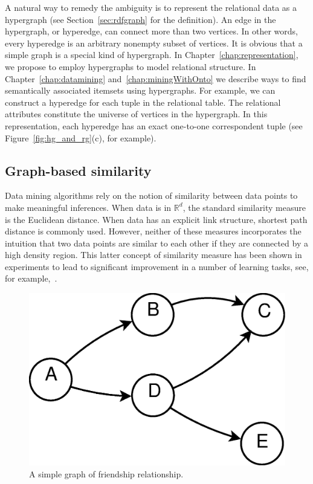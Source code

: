 A natural way to remedy the ambiguity is to represent the relational data as a hypergraph (see Section~\ref{sec:rdfgraph} for the definition). An edge in the hypergraph, or hyperedge, can connect more than two vertices. In other words, every hyperedge is an arbitrary nonempty subset of vertices. It is obvious that a simple graph is a special kind of hypergraph. In Chapter~\ref{chap:representation}, we propose to employ hypergraphs to model relational structure. In Chapter~\ref{chap:datamining} and~\ref{chap:miningWithOnto} we describe ways to find semantically associated itemsets using hypergraphs. For example, we can construct a hyperedge for each tuple in the relational table. The relational attributes constitute the universe of vertices in the hypergraph. In this representation, each hyperedge has an exact one-to-one correspondent tuple (see Figure~\ref{fig:hg_and_rg}(c), for example).

\subsection{Graph-based similarity}
Data mining algorithms rely on the notion of similarity between data points to make meaningful inferences. When data is in $\mathbb{R}^d$, the standard similarity measure is the Euclidean distance. When data has an explicit link structure, shortest path distance is commonly used. However, neither of these measures incorporates the intuition that two data points are similar to each other if they are connected by a high density region. This latter concept of similarity measure has been shown in experiments to lead to significant improvement in a number of learning tasks, see, for example,~\cite{BlumAndChawla2001,CorduneanuAndJaakkola2002,BousquetEtal03}.

\vspace{.5cm}
\begin{figure}[tbh]
\begin{center}
\includegraphics[width=.3\textwidth]{fig/pplConn.eps}
\end{center}
\caption[A simple graph of friendship relationship.]{\label{fig:pplConn} A simple graph of friendship relationship.}
\end{figure}


